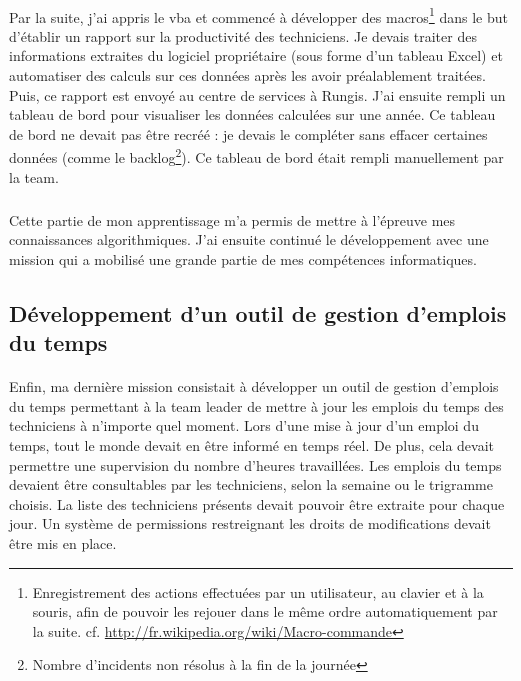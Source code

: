 \paragraph{}
Par la suite, j'ai appris le \gls{vba} et commencé à développer des \gls{macros}\footnote{Enregistrement des actions effectuées par un utilisateur, au clavier et à la souris, afin de pouvoir les rejouer dans le même ordre automatiquement par la suite. cf. \url{http://fr.wikipedia.org/wiki/Macro-commande}} dans le but d'établir un rapport sur la productivité des techniciens. Je devais traiter des informations extraites du logiciel propriétaire (sous forme d'un tableau Excel) et automatiser des calculs sur ces données après les avoir préalablement traitées. Puis, ce rapport est envoyé au centre de services à Rungis. J'ai ensuite rempli un tableau de bord pour visualiser les données calculées sur une année. 
Ce tableau de bord ne devait pas être recréé : je devais le compléter sans effacer certaines données (comme le \gls{backlog}\footnote{Nombre d'incidents non résolus à la fin de la journée}). 
Ce tableau de bord était rempli manuellement par la \gls{team}.%
\subparagraph{}
Cette partie de mon apprentissage m'a permis de mettre à l'épreuve mes connaissances algorithmiques. J'ai ensuite continué le développement avec une mission qui a mobilisé une grande partie de mes compétences informatiques.



\subsection{Développement d'un outil de gestion d'emplois du temps}%
\paragraph{}
Enfin, ma dernière mission consistait à développer un outil de gestion d'emplois du temps permettant à la \foreignlanguage{english}{team leader} de mettre à jour les emplois du temps des techniciens à n’importe quel moment. Lors d'une mise à jour d'un emploi du temps, tout le monde devait en être informé en temps réel. De plus, cela devait permettre une supervision du nombre d'heures travaillées. Les emplois du temps devaient être consultables par les techniciens, selon la semaine ou le trigramme choisis. La liste des techniciens présents devait pouvoir être extraite pour chaque jour. Un système de permissions restreignant les droits de modifications devait être mis en place.
